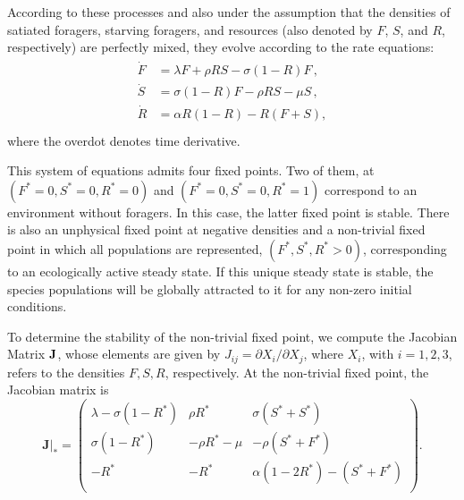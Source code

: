 \documentclass[11pt]{iopart}
\begin{document}
According to these processes and also under the assumption that the densities
of satiated foragers, starving foragers, and resources (also denoted by $F$,
$S$, and $R$, respectively) are perfectly mixed, they evolve according to the
rate equations:
\begin{align}
  \label{RE}
\begin{split}
\dot F &= \lambda F + \rho  RS - \sigma (1-R)F\,,\\
\dot S &= \sigma (1-R)F - \rho RS - \mu S\,, \\
\dot R &= \alpha R(1-R) -  R(F+S),\\
\end{split}
\end{align}
where the overdot denotes time derivative.

This system of equations admits four fixed points.  Two of them, at
$(F^*\!=\!0,S^*\!=\!0,R^*\!=\!0)$ and $(F^*\!=\!0,S^*\!=\!0,R^*\!=\!1)$
correspond to an environment without foragers.  In this case, the latter
fixed point is stable.  There is also an unphysical fixed point at negative
densities and a non-trivial fixed point in which all populations are
represented, $(F^*,S^*,R^*\!>\!0)$, corresponding to an ecologically active
steady state.  If this unique steady state is stable, the species populations
will be globally attracted to it for any non-zero initial conditions.

To determine the stability of the non-trivial fixed point, we compute the
Jacobian Matrix $\bf J$, whose elements are given by
$J_{ij}=\partial X_i/\partial X_j$, where $X_i$, with $i=1,2,3$, refers to
the densities $F,S,R$, respectively.  At the non-trivial fixed point, the
Jacobian matrix is
\begin{equation}
\mathbf{J}|_* = 
\left(
\begin{array}{lll}
  \lambda  - \sigma(1-R^*)  & \rho R^* & \sigma(S^*+ S^*) \\
  \sigma(1-R^*) & - \rho R^*-\mu &   -\rho  (S^*+ F^*) \\
  - R^* & - R^* & \alpha(1-2 R^*)-(S^*+F^*) \\
\end{array}
\right).
\end{equation}
\end{document}
